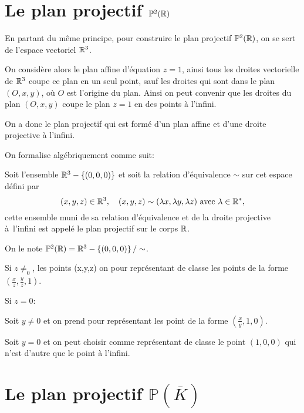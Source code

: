 \section{Le plan projectif $\mathbb{P}^2(\mathbb{R})$}

En partant du même principe, pour construire le plan projectif $\mathbb{P}^2(\mathbb{R})$, on se sert de l'espace vectoriel $\mathbb{R}^3$.

On considère alors le plan affine d'équation $z=1$, ainsi tous les droites vectorielle de $\mathbb{R}^3$ coupe ce plan en un seul point, sauf les droites qui sont dans le plan $(O,x,y)$, où $O$ est l'origine du plan. Ainsi on peut convenir que les droites du plan $(O,x,y)$ coupe le plan $z=1$ en des points à l'infini. 

On a donc le plan projectif qui est formé d'un plan affine et d'une droite projective à l'infini.

On formalise algébriquement comme suit:

\begin{definition}
    Soit l'ensemble $\mathbb{R}^3-\left\{ (0,0,0) \right\} $ et soit la relation d'équivalence $\sim$ sur cet espace défini par
    \[
        (x,y,z) \in \mathbb{R}^3, \quad (x,y,z) \sim (\lambda x, \lambda y, \lambda z) \text{ avec } \lambda \in \mathbb{R}^{*}
    ,\] 
    cette ensemble muni de sa relation d'équivalence et de la droite projective à l'infini est appelé le plan projectif sur le corps $\mathbb{R}$.

    On le note $\mathbb{P}^2(\mathbb{R})=\mathbb{R}^3-\left\{ (0,0,0) \right\} / \sim$.
\end{definition}

\begin{remarque}
    Si $z\neq_0$, les points (x,y,z) on pour représentant de classe les points de la forme $(\frac{x}{z},\frac{y}{z},1)$.

    Si $z=0$:

    Soit $y\neq 0$ et on prend pour représentant les point de la forme $(\frac{x}{y},1,0)$.

    Soit $y=0$ et on peut choisir comme représentant de classe le point $(1,0,0)$ qui n'est d'autre que le point à l'infini.
\end{remarque}

\section{Le plan projectif $\mathbb{P}(\overline{K})$}

